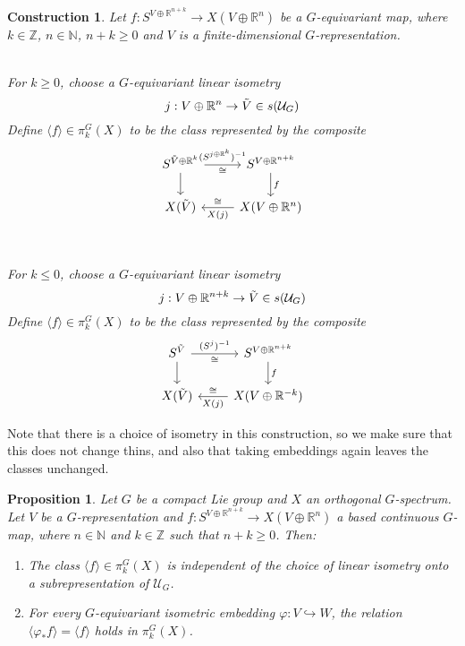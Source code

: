 \documentclass{scrartcl}
\newcommand{\bN}{\mathbb{N}}
\newcommand{\bZ}{\mathbb{Z}}
\newcommand{\bR}{\mathbb{R}}
\newtheorem{prop}[subsection]{Proposition}
\newtheorem{cons}[subsection]{Construction}
\begin{document}
\begin{cons}
    Let $f:S^{V\oplus \bR^{n+k}}\to X(V\oplus \bR^n)$ be a $G$-equivariant map, where $k\in \bZ$, $n\in\bN$, $n+k\geq 0$ and $V$ is a finite-dimensional $G$-representation. \\ \\
    \begin{minipage}{.475\textwidth}
        For $k\geq 0$, choose a $G$-equivariant linear isometry $$j:V\oplus\bR^n\to \Tilde{V}\in s(\mathcal{U}_G)$$ Define $\langle f\rangle\in\pi^G_k(X)$ to be the class represented by the composite 
        \[\begin{tikzcd}
            S^{\Tilde{V}\oplus\bR^k} \arrow[r, "(S^{j\oplus \bR^k})^{-1}", "\cong"'] \arrow[d] & S^{V\oplus\bR^{n+k}} \arrow[d, "f"] \\ X(\Tilde{V}) &  X(V\oplus\bR^n) \arrow[l, "X(j)", "\cong"']
        \end{tikzcd}\]
    \end{minipage}  
    \begin{minipage}{.05\textwidth} \ \end{minipage}
    \begin{minipage}{.475\textwidth}
        For $k\leq 0$, choose a $G$-equivariant linear isometry $$j:V\oplus\bR^{n+k}\to \Tilde{V}\in s(\mathcal{U}_G)$$ Define $\langle f\rangle\in\pi^G_k(X)$ to be the class represented by the composite
        \[\begin{tikzcd}
            S^{\Tilde{V}} \arrow[r, "(S^{j})^{-1}", "\cong"'] \arrow[d] & S^{V\oplus\bR^{n+k}} \arrow[d, "f"] \\ X(\Tilde{V}) &  X(V\oplus\bR^{-k}) \arrow[l, "X(j)", "\cong"']
        \end{tikzcd}\]
    \end{minipage}
\end{cons}

Note that there is a choice of isometry in this construction, so we make sure that this does not change thins, and also that taking embeddings again leaves the classes unchanged.

\begin{prop}\cite[3.1.14]{GHT}
    Let $G$ be a compact Lie group and $X$ an orthogonal $G$-spectrum. Let $V$ be a $G$-representation and $f:S^{V\oplus\bR^{n+k}}\to X(V\oplus\bR^n)$ a based continuous $G$-map, where $n\in\bN$ and $k\in\bZ$ such that $n+k\geq 0$. Then:
    \begin{enumerate}
        \item The class $\langle f\rangle\in\pi^G_k(X)$ is independent of the choice of linear isometry onto a subrepresentation of $\mathcal{U}_G$.
        \item For every $G$-equivariant isometric embedding $\varphi:V\hookrightarrow W$, the relation $\langle \varphi_*f\rangle = \langle f\rangle$ holds in $\pi^G_k(X)$.
    \end{enumerate}
\end{prop}
\end{document}
